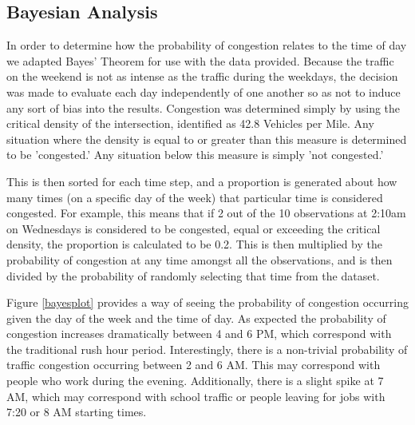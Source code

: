 \documentclass{report}
\begin{document}
\subsection*{Bayesian Analysis}

In order to determine how the probability of congestion relates to the time of day we adapted Bayes' Theorem for use with the data provided. Because the traffic on the weekend is not as intense as the traffic during the weekdays, the decision was made to evaluate each day independently of one another so as not to induce any sort of bias into the results. Congestion was determined simply by using the critical density of the intersection, identified as 42.8 Vehicles per Mile. Any situation where the density is equal to or greater than this measure is determined to be 'congested.' Any situation below this measure is simply 'not congested.'

This is then sorted for each time step, and a proportion is generated about how many times (on a specific day of the week) that particular time is considered congested. For example, this means that if 2 out of the 10 observations at 2:10am on Wednesdays is considered to be congested, equal or exceeding the critical density, the proportion is calculated to be 0.2. This is then multiplied by the probability of congestion at any time amongst all the observations, and is then divided by the probability of randomly selecting that time from the dataset.

Figure \ref{bayesplot} provides a way of seeing the probability of congestion
occurring given the day of the week and the time of day. As expected the probability
of congestion increases dramatically between 4 and 6 PM, which correspond with the
traditional rush hour period. Interestingly, there is a non-trivial probability of
traffic congestion occurring between 2 and 6 AM. This may correspond with people
who work during the evening. Additionally, there is a slight spike at 7 AM, which
may correspond with school traffic or people leaving for jobs with 7:20 or 8 AM
starting times.
\end{document}
